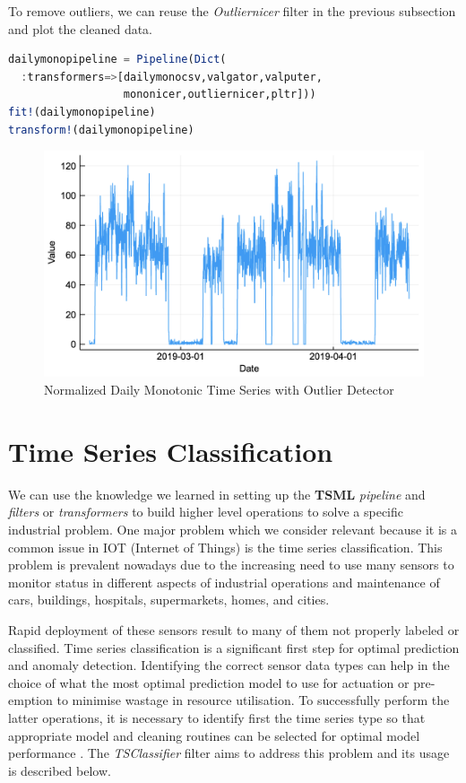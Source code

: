\documentclass{juliacon}
\begin{document}
To remove outliers, we can reuse the \emph{Outliernicer} filter in the previous subsection and plot the cleaned data.

\begin{lstlisting}[language = Julia]
dailymonopipeline = Pipeline(Dict(
  :transformers=>[dailymonocsv,valgator,valputer,
                  mononicer,outliernicer,pltr]))
fit!(dailymonopipeline)
transform!(dailymonopipeline)
\end{lstlisting}

\begin{figure}[htbp]
   \centering
   \includegraphics[width=\columnwidth]{outnormdailymono.png}  %
   \caption{Normalized Daily Monotonic Time Series with Outlier Detector}
   \label{fig:outndailymono}
\end{figure}


\section{Time Series Classification}

We can use the knowledge we learned in setting up the \textbf{TSML}
\emph{pipeline} and \emph{filters} or \emph{transformers} to build higher level
operations to solve a specific industrial problem. One major problem
which we consider relevant because it is a common issue in IOT (Internet of Things) 
 is the time series classification. This problem is prevalent nowadays 
due to the increasing need to use many sensors to monitor status in different aspects of industrial
operations and maintenance of cars, buildings, hospitals, supermarkets, homes, and cities.

\vskip 6pt

Rapid deployment of these sensors result to many of them not properly labeled or classified.
Time series classification is a significant first step for optimal prediction and anomaly detection.
Identifying the correct sensor data types can help in the choice of what the most optimal prediction 
model to use for actuation or pre-emption to minimise wastage in resource utilisation.
To successfully perform the latter operations, it is necessary to identify first the time series
type so that appropriate model and cleaning routines can be selected for optimal model performance . 
The  \emph{TSClassifier} filter aims to address this problem and its usage is described below.
\end{document}

